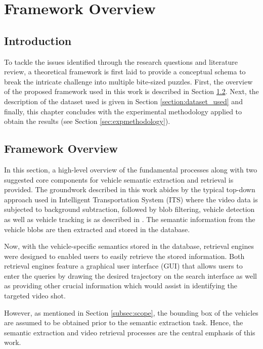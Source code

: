 \chapter{Framework Overview}
\label{chapter:framework}
\section{Introduction}
To tackle the issues identified through the research questions and literature review, a theoretical framework is first laid to provide a conceptual schema to break the intricate challenge into multiple bite-sized puzzles. First, the overview of the proposed framework used in this work is described in Section \ref{section:framework}. Next, the description of the dataset used is given in Section \ref{section:dataset_used} and finally, this chapter concludes with the experimental methodology applied to obtain the results (see Section \ref{sec:expmethodology}).


\section{Framework Overview}
\label{section:framework}
In this section, a high-level overview of the fundamental processes along with two suggested core components for vehicle semantic extraction and retrieval is provided.
The groundwork described in this work abides by the typical top-down approach used in Intelligent Transportation System (ITS) where the video data is subjected to background subtraction, followed by blob filtering, vehicle detection as well as vehicle tracking is as described in \cite{lim2017}.
The semantic information from the vehicle blobs are then extracted and stored in the database.

Now, with the vehicle-specific semantics stored in the database, retrieval engines were designed to enabled users to easily retrieve the stored information. Both retrieval engines feature a graphical user interface (GUI) that allows users to enter the queries by drawing the desired trajectory on the search interface as well as providing other crucial information which would assist in identifying the targeted video shot.

However, as mentioned in Section \ref{subsec:scope}, the bounding box of the vehicles are assumed to be obtained prior to the semantic extraction task. Hence, the semantic extraction and video retrieval processes are the central emphasis of this work.

